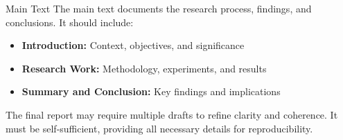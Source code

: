 \begin{frame}{Main Text}
  The main text documents the research process, findings, and conclusions.  
  It should include:  
  \begin{itemize}
    \item \textbf{Introduction:} Context, objectives, and significance  
    \item \textbf{Research Work:} Methodology, experiments, and results  
    \item \textbf{Summary and Conclusion:} Key findings and implications  
  \end{itemize}

  The final report may require multiple drafts to refine clarity and coherence.  
  It must be self-sufficient, providing all necessary details for reproducibility.  
\end{frame}

